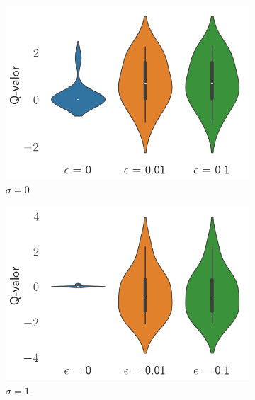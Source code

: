 \documentclass[12pt]{article}
\begin{document}
    \begin{figure}[h]
        \centering

        \begin{subfigure}[H]{0.3\textwidth}
            \includegraphics[width=\textwidth]{../img/values_sigma_0}
            \caption{$\sigma=0$}
            \label{fig:estimations_0}
        \end{subfigure}
        \begin{subfigure}[H]{0.3\textwidth}
            \includegraphics[width=\textwidth]{../img/values_sigma_1}
            \caption{$\sigma=1$}
            \label{fig:estimations_1}
        \end{subfigure}
        \begin{subfigure}[H]{0.3\textwidth}

\end{subfigure}
\end{figure}
\end{document}
